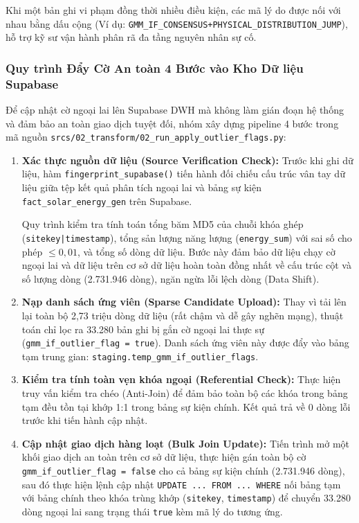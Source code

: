 \documentclass[12pt, a4paper]{report}
\begin{document}
Khi một bản ghi vi phạm đồng thời nhiều điều kiện, các mã lý do được nối với nhau bằng dấu cộng (Ví dụ: \texttt{GMM\_IF\_CONSENSUS+PHYSICAL\_DISTRIBUTION\_JUMP}), hỗ trợ kỹ sư vận hành phân rã đa tầng nguyên nhân sự cố.

\subsubsection{Quy trình Đẩy Cờ An toàn 4 Bước vào Kho Dữ liệu Supabase}
Để cập nhật cờ ngoại lai lên Supabase DWH mà không làm gián đoạn hệ thống và đảm bảo an toàn giao dịch tuyệt đối, nhóm xây dựng pipeline 4 bước trong mã nguồn \texttt{srcs/02\_transform/02\_run\_apply\_outlier\_flags.py}:
\begin{enumerate}
    \item \textbf{Xác thực nguồn dữ liệu (Source Verification Check):} Trước khi ghi dữ liệu, hàm \texttt{fingerprint\_supabase()} tiến hành đối chiếu cấu trúc vân tay dữ liệu giữa tệp kết quả phân tích ngoại lai và bảng sự kiện \texttt{fact\_solar\_energy\_gen} trên Supabase. 
    
    Quy trình kiểm tra tính toán tổng băm MD5 của chuỗi khóa ghép (\texttt{sitekey|timestamp}), tổng sản lượng năng lượng (\texttt{energy\_sum}) với sai số cho phép $\le 0{,}01$, và tổng số dòng dữ liệu. Bước này đảm bảo dữ liệu chạy cờ ngoại lai và dữ liệu trên cơ sở dữ liệu hoàn toàn đồng nhất về cấu trúc cột và số lượng dòng (2.731.946 dòng), ngăn ngừa lỗi lệch dòng (Data Shift).
    
    \item \textbf{Nạp danh sách ứng viên (Sparse Candidate Upload):} Thay vì tải lên lại toàn bộ 2,73 triệu dòng dữ liệu (rất chậm và dễ gây nghẽn mạng), thuật toán chỉ lọc ra 33.280 bản ghi bị gắn cờ ngoại lai thực sự (\texttt{gmm\_if\_outlier\_flag = true}). Danh sách ứng viên này được đẩy vào bảng tạm trung gian: \texttt{staging.temp\_gmm\_if\_outlier\_flags}.
    
    \item \textbf{Kiểm tra tính toàn vẹn khóa ngoại (Referential Check):} Thực hiện truy vấn kiểm tra chéo (Anti-Join) để đảm bảo toàn bộ các khóa trong bảng tạm đều tồn tại khớp 1:1 trong bảng sự kiện chính. Kết quả trả về 0 dòng lỗi trước khi tiến hành cập nhật.
    
    \item \textbf{Cập nhật giao dịch hàng loạt (Bulk Join Update):} Tiến trình mở một khối giao dịch an toàn trên cơ sở dữ liệu, thực hiện gán toàn bộ cờ \texttt{gmm\_if\_outlier\_flag = false} cho cả bảng sự kiện chính (2.731.946 dòng), sau đó thực hiện lệnh cập nhật \texttt{UPDATE ... FROM ... WHERE} nối bảng tạm với bảng chính theo khóa trùng khớp (\texttt{sitekey}, \texttt{timestamp}) để chuyển 33.280 dòng ngoại lai sang trạng thái \texttt{true} kèm mã lý do tương ứng.
\end{enumerate}
\end{document}
